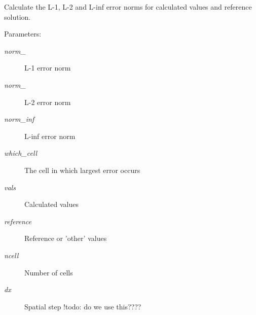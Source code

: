 Calculate the L-1, L-2 and L-inf error norms for calculated values and reference solution. 

\begin{Desc}
\item[Parameters:]
\begin{description}
\item[{\em norm\_}]L-1 error norm\item[{\em norm\_}]L-2 error norm\item[{\em norm\_\-inf}]L-inf error norm\item[{\em which\_\-cell}]The cell in which largest error occurs\item[{\em vals}]Calculated values\item[{\em reference}]Reference or 'other' values\item[{\em ncell}]Number of cells\item[{\em dx}]Spatial step !todo: do we use this???? \end{description}
\end{Desc}
